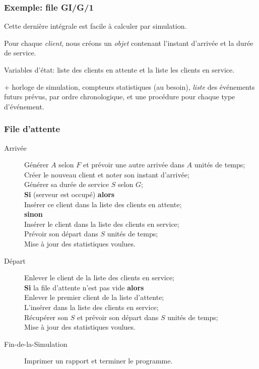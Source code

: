 \documentclass[t,usepdftitle=false]{beamer}
\begin{document}
\begin{frame}
\frametitle{Exemple: file GI/G/1}
Cette dernière intégrale est facile à calculer par simulation.

\mbox{}

Pour chaque \emph{client}, nous créons un \emph{objet} contenant l'instant  d'arrivée et la durée de service.

\mbox{}

Variables d'état: liste des clients en attente et la liste les clients en service.

\mbox{}

+ horloge de simulation,
compteurs statistiques (au besoin), \emph{liste} des événements futurs prévus, 
 par ordre chronologique, et une procédure pour chaque type d'événement.
 
\end{frame}

\begin{frame}
\frametitle{File d'attente}

\begin{small}
\begin{description}
\item[Arrivée]
Générer $A$ selon $F$ et prévoir une autre arrivée 
    dans $A$ unités de temps;\\
Créer le nouveau client et noter son instant d'arrivée;\\
Générer sa durée de service $S$ selon $G$;\\
{\bf Si} (serveur est occupé) {\bf alors}\\
\quad Insérer ce client dans la liste des clients en attente;\\
{\bf sinon}\\
\quad   Insérer le client dans la liste des clients en service;\\
\quad   Prévoir son départ dans $S$ unités de temps; \\
Mise à jour des statistiques voulues.
\item[Départ]
Enlever le client de la liste des clients en service;\\
{\bf Si} la file d'attente n'est pas vide {\bf alors}\\
\quad  Enlever le premier client de la liste d'attente;\\
\quad  L'insérer dans la liste des clients en service;\\
\quad  Récupérer son $S$ et prévoir son départ dans 
       $S$ unités de temps;\\
Mise à jour des statistiques voulues.
\item[Fin-de-la-Simulation]
Imprimer un rapport et terminer le programme.
\end{description}
\end{small}
\end{frame}
\end{document}
